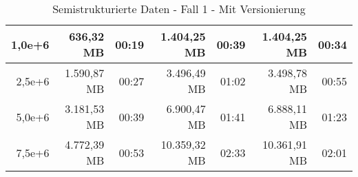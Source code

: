 \begin{table}
\begin{tabular}{|r|r|r|r|r|r|r|}
        1,0e+6          & 636,32 MB           & 00:19           & 1.404,25 MB         & 00:39           & 1.404,25 MB         & 00:34           \\ \hline
        2,5e+6          & 1.590,87 MB         & 00:27           & 3.496,49 MB         & 01:02           & 3.498,78 MB         & 00:55           \\ \hline
        5,0e+6          & 3.181,53 MB         & 00:39           & 6.900,47 MB         & 01:41           & 6.888,11 MB         & 01:23           \\ \hline
        7,5e+6          & 4.772,39 MB         & 00:53           & 10.359,32 MB        & 02:33           & 10.361,91 MB        & 02:01           \\ \hline
    \end{tabular}
    \caption{Semistrukturierte Daten - Fall 1 - Mit Versionierung}
\end{table}

